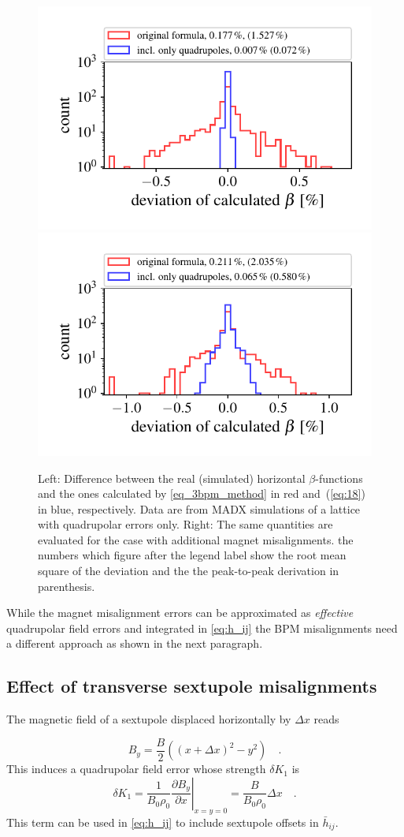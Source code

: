 \begin{figure}
	\centering
  \includegraphics[width=.49\linewidth]{hist1518_ONLYQUADS_01}
  \includegraphics[width=.49\linewidth]{hist1518_NAIV_01}
	\caption{
        Left: Difference between the real (simulated) horizontal $\beta$-functions and the ones
        calculated by \eqref{eq_3bpm_method} in red and~(\ref{eq:18}) in blue, respectively. Data are from MADX
        simulations of a lattice with quadrupolar errors only.
        Right: The same quantities are evaluated for the case with additional magnet misalignments.
        the numbers which figure after the legend label show the root mean square of the deviation
        and the the peak-to-peak derivation in parenthesis.
    }
	\label{fig:hist1518}
\end{figure}

While the magnet misalignment errors can be approximated as \emph{effective} quadrupolar field errors
and integrated in \eqref{eq:h_ij} the BPM misalignments need a different approach as shown in the
next paragraph.

\subsection{Effect of transverse sextupole misalignments}

The magnetic field of a sextupole displaced horizontally by $ \Delta x $ reads

\begin{equation}
B_y = \frac{B}{2}((x + \Delta x)^2 - y^2)\quad .
\end{equation}
{This induces a quadrupolar field error whose strength $ \delta K_1 $ is}
\begin{equation}
\delta K_1 =  \left.\frac{1}{B_0\rho_0}\frac{\partial B_y}{\partial x}\right|_{x=y=0}
  = \frac{B}{B_0\rho_0}\Delta x \quad .
\end{equation}
This {term} can be used in \eqref{eq:h_ij} to include sextupole offsets in $ \bar{h}_{ij} $.

